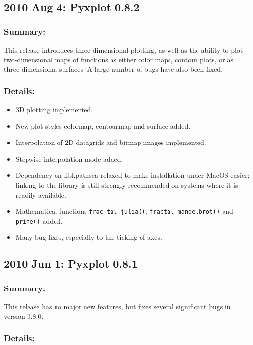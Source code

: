 \subsection*{2010 Aug 4: Pyxplot 0.8.2}

\subsubsection*{Summary:}

This release introduces three-dimensional plotting, as well as the ability to plot two-dimensional maps of functions as either color maps, contour plots, or as three-dimensional surfaces. A large number of bugs have also been fixed.

\subsubsection*{Details:}

\begin{itemize}
\item 3D plotting implemented.
\item New plot styles colormap, contourmap and surface added.
\item Interpolation of 2D datagrids and bitmap images implemented.
\item Stepwise interpolation mode added.
\item Dependency on libkpathsea relaxed to make installation under MacOS easier; linking to the library is still strongly recommended on systems where it is readily available.
\item Mathematical functions {\tt frac-tal\_\-julia()}, {\tt frac\-tal\_\-man\-del\-brot()} and {\tt prime()} added.
\item Many bug fixes, especially to the ticking of axes.
\end{itemize}

\subsection*{2010 Jun 1: Pyxplot 0.8.1}

\subsubsection*{Summary:}

This release has no major new features, but fixes several significant bugs in version 0.8.0.

\subsubsection*{Details:}

